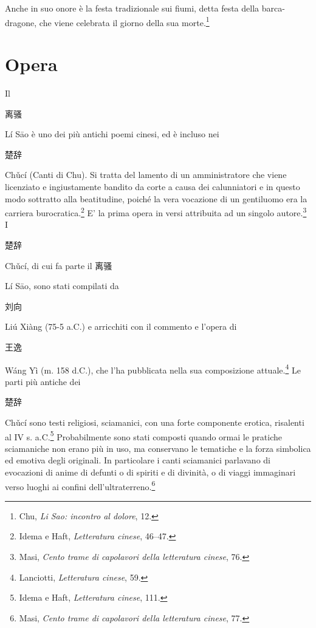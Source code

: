 \documentclass[12pt,titlepage]{article}
\begin{document}
 Anche in suo onore è la festa tradizionale sui fiumi, detta festa della barca-dragone, che viene celebrata il giorno della sua morte.\footnote{Chu, \emph{Li Sao: incontro al dolore}, 12.}
\section{Opera}
Il 
\begin{CJK*}{UTF8}{gbsn}离骚\end{CJK*}
 Lí Sāo è uno dei più antichi poemi cinesi, ed è incluso nei 
 \begin{CJK*}{UTF8}{gbsn}楚辞 \end{CJK*}
 Chǔcí (Canti di Chu). Si tratta del lamento di un amministratore che viene licenziato e ingiustamente bandito da corte a causa dei calunniatori e in questo modo sottratto alla beatitudine, poiché la vera vocazione di un gentiluomo era la carriera burocratica.\footnote{Idema e Haft, \emph{Letteratura cinese}, 46–47.} E' la prima opera in versi attribuita ad un singolo autore.\footnote{Masi, \emph{Cento trame di capolavori della letteratura cinese}, 76.}
I 
\begin{CJK*}{UTF8}{gbsn}楚辞\end{CJK*}
 \begin{CJK*}{UTF8}{gbsn}Chǔcí, di cui fa parte il 
 离骚\end{CJK*}
  Lí Sāo, sono stati compilati da 
 \begin{CJK*}{UTF8}{gbsn} 刘向\end{CJK*}
   Liú Xiàng (75-5 a.C.) e arricchiti con il commento e l'opera di 
  \begin{CJK*}{UTF8}{gbsn} 王逸 \end{CJK*}
   Wáng Yì (m. 158 d.C.), che l'ha pubblicata nella sua composizione attuale.\footnote{Lanciotti, \emph{Letteratura cinese}, 59.} Le parti più antiche dei 
  \begin{CJK*}{UTF8}{gbsn} 楚辞\end{CJK*}
    Chǔcí sono testi religiosi, sciamanici, con una forte componente erotica, risalenti al IV s. a.C.\footnote{Idema e Haft, \emph{Letteratura cinese}, 111.} Probabilmente sono stati composti quando ormai le pratiche sciamaniche non erano più in uso, ma conservano le tematiche e la forza simbolica ed emotiva degli originali. In particolare i canti sciamanici parlavano di evocazioni di anime di defunti o di spiriti e di divinità, o di viaggi immaginari verso luoghi ai confini dell'ultraterreno.\footnote{Masi, \emph{Cento trame di capolavori della letteratura cinese}, 77.}
\end{document}
